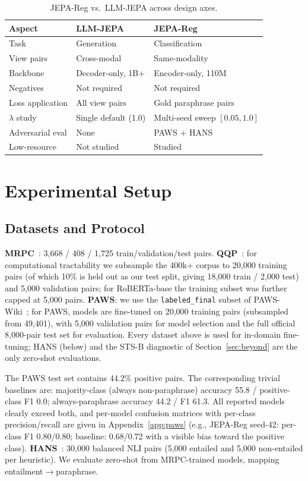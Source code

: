 \documentclass[sigconf]{acmart}
\begin{document}
\begin{table}[!htbp]
\caption{JEPA-Reg vs.\ LLM-JEPA across design axes.}
\label{tab:llmjepa}
\begin{tabular}{lll}
\toprule
Aspect & LLM-JEPA & JEPA-Reg \\
\midrule
Task & Generation & Classification \\
View pairs & Cross-modal & Same-modality \\
Backbone & Decoder-only, 1B+ & Encoder-only, 110M \\
Negatives & Not required & Not required \\
Loss application & All view pairs & Gold paraphrase pairs \\
$\lambda$ study & Single default (1.0) & Multi-seed sweep $[0.05,1.0]$ \\
Adversarial eval & None & PAWS + HANS \\
Low-resource & Not studied & Studied \\
\bottomrule
\end{tabular}
\end{table}

\section{Experimental Setup}

\subsection{Datasets and Protocol}
\label{sec:datasets}
\textbf{MRPC}~\cite{wang2019glue}: 3,668 / 408 / 1,725 train/validation/test pairs. \textbf{QQP}~\cite{wang2019glue}: for computational tractability we subsample the 400k+ corpus to 20,000 training pairs (of which 10\% is held out as our test split, giving 18,000 train / 2,000 test) and 5,000 validation pairs; for RoBERTa-base the training subset was further capped at 5,000 pairs. \textbf{PAWS}: we use the \texttt{labeled\_final} subset of PAWS-Wiki~\cite{zhang2019paws}; for PAWS, models are fine-tuned on 20,000 training pairs (subsampled from 49,401), with 5,000 validation pairs for model selection and the full official 8,000-pair test set for evaluation. Every dataset above is used for in-domain fine-tuning; HANS (below) and the STS-B diagnostic of Section~\ref{sec:beyond} are the only zero-shot evaluations.

The PAWS test set contains 44.2\% positive pairs. The corresponding trivial baselines are: majority-class (always non-paraphrase) accuracy 55.8 / positive-class F1 0.0; always-paraphrase accuracy 44.2 / F1 61.3. All reported models clearly exceed both, and per-model confusion matrices with per-class precision/recall are given in Appendix~\ref{app:paws} (e.g., JEPA-Reg seed-42: per-class F1 0.80/0.80; baseline: 0.68/0.72 with a visible bias toward the positive class). \textbf{HANS}~\cite{mccoy2019right}: 30,000 balanced NLI pairs (5,000 entailed and 5,000 non-entailed per heuristic). We evaluate zero-shot from MRPC-trained models, mapping entailment$\rightarrow$paraphrase.
\end{document}
